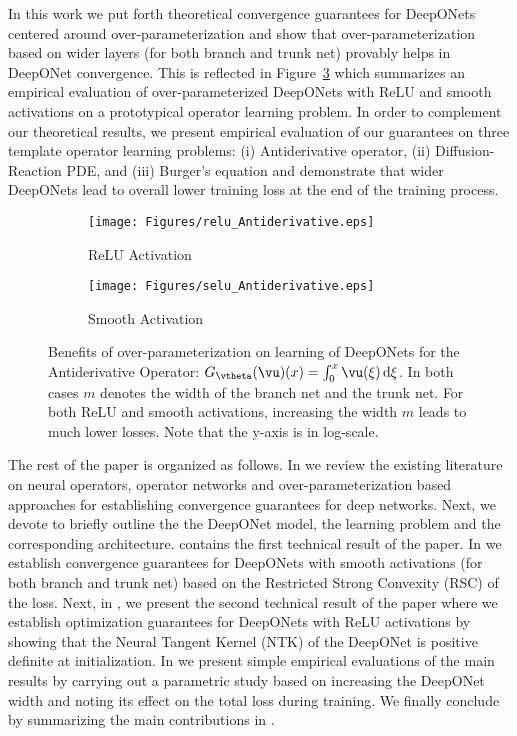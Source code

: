 In this work we put forth theoretical convergence guarantees for DeepONets centered around over-parameterization and show that over-parameterization based on wider layers (for both branch and trunk net) provably helps in DeepONet convergence. This is reflected in Figure~\ref{fig:Fig1} which summarizes an empirical evaluation of over-parameterized DeepONets with ReLU and smooth activations on a prototypical operator learning problem. In order to complement our theoretical results, we present empirical evaluation of our guarantees on three template operator learning problems: {(i)} Antiderivative operator, {(ii)} Diffusion-Reaction PDE, and {(iii)} Burger's equation and demonstrate that wider DeepONets lead to overall lower training loss at the end of the training process. 

\begin{figure}[t]
    \centering
    \begin{subfigure}[H]{0.4\textwidth}
        \centering
        \texttt{[image: Figures/relu\_Antiderivative.eps]}
        \caption{ReLU Activation}
        \label{fig:LearningReLU}
    \end{subfigure}\qquad\begin{subfigure}[H]{0.4\textwidth}
        \centering
        \texttt{[image: Figures/selu\_Antiderivative.eps]}
        \caption{Smooth Activation}
        \label{fig:LearningSeLU}
    \end{subfigure}
    \caption{Benefits of over-parameterization on learning of DeepONets for the Antiderivative Operator: $G_{\vtheta}(\vu)(x) = \int_{0}^x\vu(\xi)\, \mathrm{d}\xi$. In both cases $m$ denotes the width of the branch net and the trunk net. For both ReLU and smooth activations, increasing the width $m$ leads to much lower losses. Note that the y-axis is in log-scale.}
    \label{fig:Fig1}
\end{figure}

The rest of the paper is organized as follows. In  we review the existing literature on neural operators, operator networks and over-parameterization based approaches for establishing convergence guarantees for deep networks. Next, we devote  to briefly outline the the DeepONet model, the learning problem and the corresponding architecture.  contains the first technical result of the paper. In  we establish convergence guarantees for DeepONets with smooth activations (for both branch and trunk net) based on the Restricted Strong Convexity (RSC) of the loss. Next, in , we present the second technical result of the paper where we establish optimization guarantees for DeepONets with ReLU activations by showing that the Neural Tangent Kernel (NTK) of the DeepONet is positive definite at initialization. In  we present simple empirical evaluations of the main results by carrying out a parametric study based on increasing the DeepONet width and noting its effect on the total loss during training. We finally conclude by summarizing the main contributions in .
